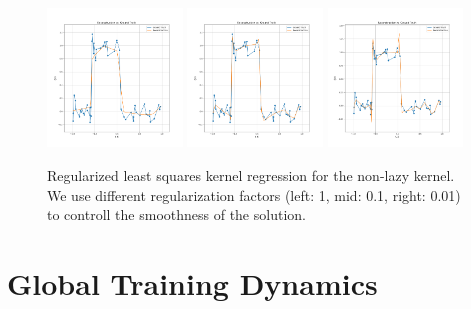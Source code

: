 \begin{figure}
    \centering
    \includegraphics[width=0.32\textwidth]{figures/nonlazy-square-noise-lsq-1e0.png}
    \includegraphics[width=0.32\textwidth]{figures/nonlazy-square-noise-lsq-1e-1.png}
    \includegraphics[width=0.32\textwidth]{figures/nonlazy-square-noise-lsq-1e-2.png}
    \caption{Regularized least squares kernel regression for the non-lazy kernel. We use different regularization factors (left: 1, mid: 0.1, right: 0.01) to controll the smoothness of the solution.}
    \label{fig:lsq-non-lazy}
\end{figure}

\section{Global Training Dynamics}

